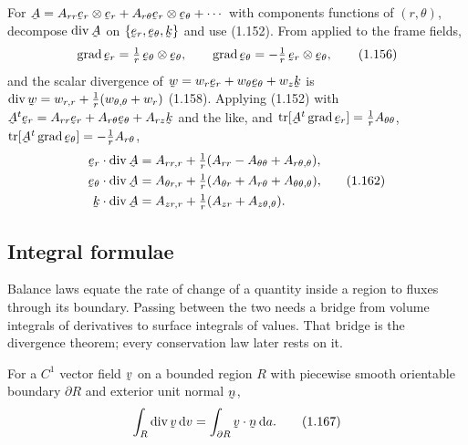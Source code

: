 \begin{example}\label{ex:divpolar}
For $\bA=A_{rr}\ber\otimes\ber+A_{r\theta}\ber\otimes\beth+\cdots$ with
components functions of $(r,\theta)$, decompose $\dvg\bA$ on
$\{\ber,\beth,\bk\}$ and use (1.152). From  applied to the frame
fields,
\begin{equation}
\grad\ber=\tfrac1r\,\beth\otimes\beth,\qquad
\grad\beth=-\tfrac1r\,\ber\otimes\beth, \tag{1.156}\label{eq:1.156}
\end{equation}
and the scalar divergence of $\bw=w_r\ber+w_\theta\beth+w_z\bk$ is
$\dvg\bw=w_{r,r}+\tfrac1r(w_{\theta,\theta}+w_r)$ (1.158). Applying (1.152)
with $\bA^{t}\ber=A_{rr}\ber+A_{r\theta}\beth+A_{rz}\bk$ and the like, and
$\tr[\bA^{t}\grad\ber]=\tfrac1rA_{\theta\theta}$,
$\tr[\bA^{t}\grad\beth]=-\tfrac1rA_{r\theta}$,
\begin{equation}
\begin{aligned}
\ber\cdot\dvg\bA&=A_{rr,r}+\tfrac1r(A_{rr}-A_{\theta\theta}+A_{r\theta,\theta}),\\
\beth\cdot\dvg\bA&=A_{\theta r,r}+\tfrac1r(A_{\theta r}+A_{r\theta}+A_{\theta\theta,\theta}),\\
\bk\cdot\dvg\bA&=A_{zr,r}+\tfrac1r(A_{zr}+A_{z\theta,\theta}).
\end{aligned}\tag{1.162}\label{eq:1.162}
\end{equation}
\end{example}

\subsection{Integral formulae}\label{ss:int}

Balance laws equate the rate of change of a quantity inside a region to
fluxes through its boundary. Passing between the two needs a bridge from
volume integrals of derivatives to surface integrals of values. That bridge
is the divergence theorem; every conservation law later rests on it.

\begin{theorem}\label{thm:div}
For a $C^{1}$ vector field $\bv$ on a bounded region $R$ with piecewise
smooth orientable boundary $\partial R$ and exterior unit normal $\bn$,
\begin{equation}
\int_{R}\dvg\bv\,\dl v=\int_{\partial R}\ip\bv\bn\,\dl a. \tag{1.167}\label{eq:1.167}
\end{equation}
\end{theorem}

